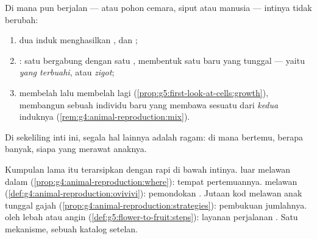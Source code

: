 \begin{proposition}\label{prop:g8:sexual-reproduction:core}
Di mana pun  berjalan ---  atau pohon cemara,
siput atau manusia --- intinya tidak berubah:
\begin{enumerate}
  \item dua induk menghasilkan ,  dan ;
  \item \emph{}: satu   bergabung dengan satu
         , membentuk satu  baru yang tunggal --- yaitu
        \emph{ yang terbuahi}, atau
        \emph{zigot};
  \item {} membelah lalu membelah lagi
        (\cref{prop:g5:first-look-at-cells:growth}), membangun sebuah
        individu baru yang membawa sesuatu dari \emph{kedua} induknya
        (\cref{rem:g4:animal-reproduction:mix}).
\end{enumerate}
Di sekeliling inti ini, segala hal lainnya adalah ragam: di mana
 bertemu, berapa banyak, siapa yang merawat anaknya.
\end{proposition}
\admitted

\begin{example}\label{ex:g8:sexual-reproduction:variations}
Kumpulan lama itu terarsipkan dengan rapi di bawah intinya. 
luar melawan  dalam
(\cref{prop:g4:animal-reproduction:where}): tempat pertemuannya. 
melawan 
(\cref{def:g4:animal-reproduction:ovivivi}): pemondokan .
Jutaan   kod melawan anak tunggal gajah
(\cref{prop:g4:animal-reproduction:strategies}): pembukuan jumlahnya.
 oleh lebah atau angin
(\cref{def:g5:flower-to-fruit:steps}): layanan perjalanan 
. Satu mekanisme, sebuah katalog setelan.
\end{example}

